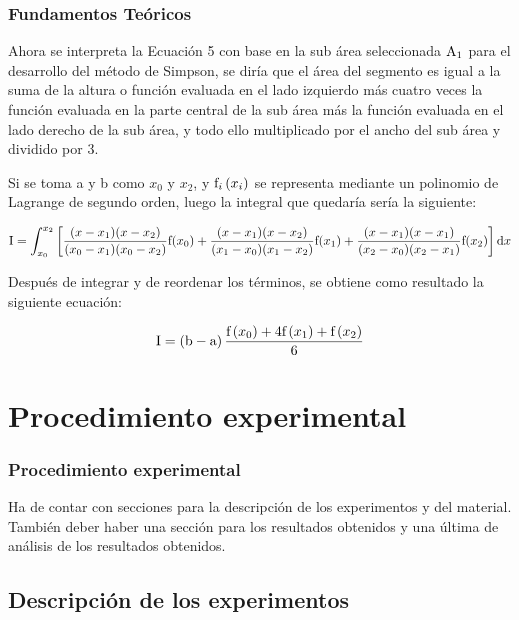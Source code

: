 \documentclass{beamer}
\begin{document}
\begin{frame}
\frametitle{Fundamentos Teóricos}
	Ahora se interpreta la Ecuación 5 con base en la sub área seleccionada $\textup{A}_{1}$ para el desarrollo del método de Simpson, se diría que el área del segmento es igual a la suma de la altura o función evaluada en el lado izquierdo más cuatro veces la función evaluada en la parte central de la sub área más la función evaluada en el lado derecho de la sub área, y todo ello multiplicado por el ancho del sub área y dividido por 3.
	
	Si se toma a y b como $ x_{0} $ y $ x_{2} $, y $ \textup{f}_{i}\left(x_{i}\right) $ se representa mediante un polinomio de Lagrange de segundo orden, luego la integral que quedaría sería la siguiente:
	
	\[ \textup{I} = \int_{x_{0}}^{x_{2}}\left[\frac{(x - x_{1})(x - x_{2})}{(x_{0} - x_{1})(x_{0} - x_{2})}\textup{f}(x_{0}) + \frac{(x 
	- x_{1})(x - x_{2})}{(x_{1} - x_{0})(x_{1} - x_{2})}\textup{f}(x_{1}) + \frac{(x - x_{1})(x - x_{1})}{(x_{2} - x_{0})(x_{2} - 
	x_{1})}\textup{f}(x_{2})\right]\textup{d}x\]	
	
	Después de integrar y de reordenar los términos, se obtiene como resultado la siguiente ecuación:
	
	\[\textup{I} = \left(\textup{b}-\textup{a}\right)\frac{\textup{f}\left(x_{0}\right) + 4\textup{f}\left(x_{1}\right) + \textup{f}\left(x_{2}\right)}{6}\]

\end{frame}


\section{Procedimiento experimental}

\begin{frame}
\frametitle{Procedimiento experimental}

Ha de contar con secciones para la descripción de los experimentos y del material.
También deber haber una sección para los resultados obtenidos y una última de
análisis de los resultados obtenidos.

\end{frame}

\subsection{Descripción de los experimentos}
\end{document}
